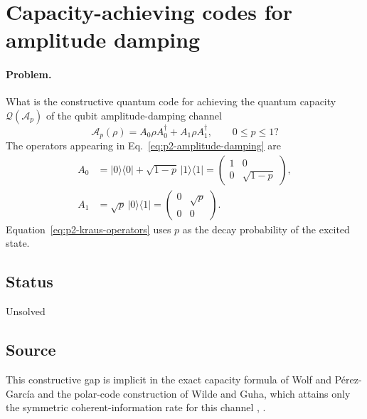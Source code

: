 \section{Capacity-achieving codes for amplitude damping}
\label{sec:problem-2}

\paragraph{Problem.}
What is the constructive quantum code for achieving the quantum capacity
$\mathcal{Q}(\mathcal A_p)$ of the qubit amplitude-damping channel
\begin{equation}
  \mathcal A_p(\rho)=A_0\rho A_0^\dagger+A_1\rho A_1^\dagger,
  \qquad 0\le p\le1?
  \label{eq:p2-amplitude-damping}
\end{equation}
The operators appearing in Eq.~\eqref{eq:p2-amplitude-damping} are
\begin{equation}
  \begin{aligned}
    A_0&=\lvert0\rangle\!\langle0\rvert
         +\sqrt{1-p}\,\lvert1\rangle\!\langle1\rvert
       =\begin{pmatrix}1&0\\0&\sqrt{1-p}\end{pmatrix},\\
    A_1&=\sqrt p\,\lvert0\rangle\!\langle1\rvert
       =\begin{pmatrix}0&\sqrt p\\0&0\end{pmatrix}.
  \end{aligned}
  \label{eq:p2-kraus-operators}
\end{equation}
Equation~\eqref{eq:p2-kraus-operators} uses $p$ as the decay probability of
the excited state.

\subsection*{Status}

Unsolved

\subsection*{Source}

This constructive gap is implicit in the exact capacity formula of Wolf and
P\'erez-Garc\'ia and the polar-code construction of Wilde and Guha, which
attains only the symmetric coherent-information rate for this channel
,
.

